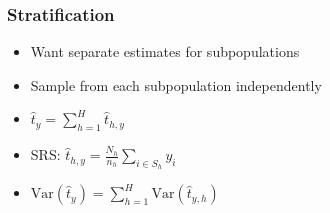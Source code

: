 \documentclass{beamer}
\begin{document}
\begin{frame}
  \frametitle{Stratification}

  \begin{itemize}
  \addtolength{\itemsep}{0.5\baselineskip}
  \item Want separate estimates for subpopulations %
  \item Sample from each subpopulation independently
  \item \(\hat{t}_{y} = \sum_{h = 1}^H\hat{t}_{h, y}\) %
  \item SRS: \(\hat{t}_{h, y} = \frac{N_h}{n_h} \sum_{i \in S_h}y_i\)
  \item \(\mathrm{Var}(\hat{t}_y) = \sum_{h =
   1}^H\mathrm{Var}\left(\hat{t}_{y, h}\right)\)
  \end{itemize}


  
\end{frame}

%
%  
\end{document}
